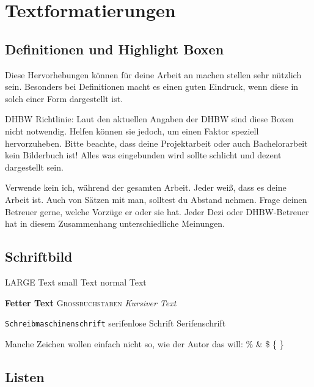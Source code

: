 \chapter{Textformatierungen}

\section{Definitionen und Highlight Boxen}

\begin{defStrich}[Definition]
Diese Hervorhebungen können für deine Arbeit an machen stellen sehr nützlich sein. Besonders bei Definitionen macht es einen guten Eindruck, wenn diese in solch einer Form dargestellt ist. 
\end{defStrich}

DHBW Richtlinie: Laut den aktuellen Angaben der DHBW sind diese Boxen nicht notwendig. Helfen können sie jedoch, um einen Faktor speziell hervorzuheben. Bitte beachte, dass deine Projektarbeit oder auch Bachelorarbeit kein Bilderbuch ist! Alles was eingebunden wird sollte schlicht und dezent dargestellt sein.

\bigskip

\begin{defEckKasten}[Wichtig] Verwende kein \glqq ich\grqq{}, während der gesamten Arbeit. Jeder weiß, dass es deine Arbeit ist. Auch von Sätzen mit \glqq man\grqq{}, solltest du Abstand nehmen. Frage deinen Betreuer gerne, welche Vorzüge er oder sie hat. Jeder Dezi oder DHBW-Betreuer hat in diesem Zusammenhang unterschiedliche Meinungen.
\end{defEckKasten}

\section{Schriftbild}
{\LARGE LARGE Text} {\small small Text} normal Text

\textbf{Fetter Text} \textsc{Großbuchstaben} \textit{Kursiver Text}

\texttt{Schreibmaschinenschrift} \textsf{serifenlose Schrift} \textrm{Serifenschrift}

Manche Zeichen wollen einfach nicht so, wie der Autor das will: \% \& \$ \{ \}

\newpage

\section{Listen}

